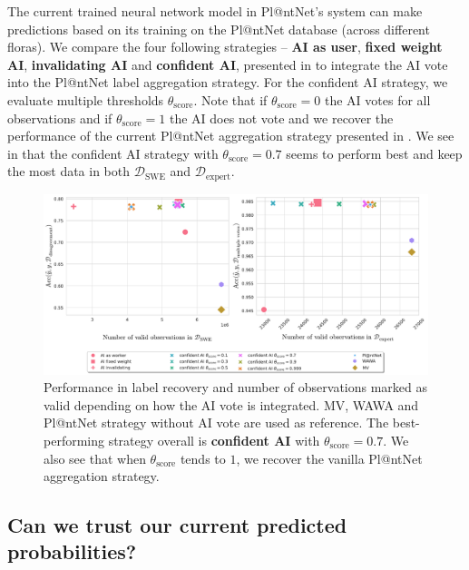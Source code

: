 The current trained neural network model in Pl@ntNet's system can make predictions based on its training on the Pl@ntNet database (across different floras).
We compare the four following strategies -- \textbf{AI as user}, \textbf{fixed weight AI}, \textbf{invalidating AI} and \textbf{confident AI}, presented in  to integrate the AI vote into the Pl@ntNet label aggregation strategy.
For the confident AI strategy, we evaluate multiple thresholds $\theta_\text{score}$.
Note that if $\theta_{\mathrm{score}}=0$ the AI votes for all observations and if $\theta_{\mathrm{score}}=1$ the AI does not vote and we recover the performance of the current Pl@ntNet aggregation strategy presented in .
We see in  that the confident AI strategy with $\theta_\mathrm{score}=0.7$ seems to perform best and keep the most data in both $\mathcal{D}_\mathrm{SWE}$ and $\mathcal{D}_\mathrm{expert}$.

\begin{figure}[tbh]
    \centering
    \includegraphics[width=\textwidth]{./images_plantnet/ai_strategy_votes.pdf}
    \caption{Performance in label recovery and number of observations marked as valid depending on how the AI vote is integrated. MV, WAWA and Pl@ntNet strategy without AI vote are used as reference. The best-performing strategy overall is \textbf{confident AI} with $\theta_\text{score}=0.7$. We also see that when $\theta_\text{score}$ tends to $1$, we recover the vanilla Pl@ntNet aggregation strategy.}
\label{fig:accuracy_vote_strategy}
\end{figure}


\subsection{Can we trust our current predicted probabilities?}

